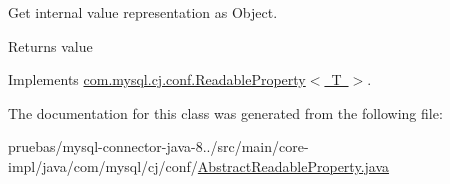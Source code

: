 Get internal value representation as Object.

\begin{DoxyReturn}{Returns}
value 
\end{DoxyReturn}


Implements \mbox{\hyperlink{interfacecom_1_1mysql_1_1cj_1_1conf_1_1_readable_property_a602dfa3dbe87560a5ceca17a38f30844}{com.\+mysql.\+cj.\+conf.\+Readable\+Property$<$ T $>$}}.



The documentation for this class was generated from the following file\+:\begin{DoxyCompactItemize}
\item 
pruebas/mysql-\/connector-\/java-\/8../src/main/core-\/impl/java/com/mysql/cj/conf/\mbox{\hyperlink{_abstract_readable_property_8java}{Abstract\+Readable\+Property.\+java}}\end{DoxyCompactItemize}
